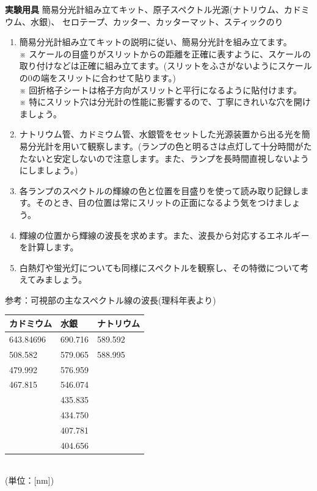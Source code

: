 \newpage

\jikken

\begin{itemsquarebox}[c]{\bf 実験用具}
簡易分光計組み立てキット、原子スペクトル光源(ナトリウム、カドミウム、水銀)、
セロテープ、カッター、カッターマット、スティックのり
\end{itemsquarebox}

\bigskip


\begin{enumerate}

\item 簡易分光計組み立てキットの説明に従い、簡易分光計を組み立てます。\\
※ スケールの目盛りがスリットからの距離を正確に表すように、スケールの取り付けなどは正確に組み立てます。(スリットをふさがないようにスケールの0の端をスリットに合わせて貼ります。)\\
※ 回折格子シートは格子方向がスリットと平行になるように貼付けます。\\
※ 特にスリット穴は分光計の性能に影響するので、丁寧にきれいな穴を開けましょう。

\item ナトリウム管、カドミウム管、水銀管をセットした光源装置から出る光を簡易分光計を用いて観察します。(ランプの色と明るさは点灯して十分時間がたたないと安定しないので注意します。また、ランプを長時間直視しないようにしましょう。)

\item 各ランプのスペクトルの輝線の色と位置を目盛りを使って読み取り記録します。そのとき、目の位置は常にスリットの正面になるよう気をつけましょう。

\item 輝線の位置から輝線の波長を求めます。また、波長から対応するエネルギーを計算します。

\item 白熱灯や蛍光灯についても同様にスペクトルを観察し、その特徴について考えてみましょう。


\end{enumerate}

\newpage

参考：可視部の主なスペクトル線の波長(理科年表より)\\
\hspace*{1cm}
\begin{tabular}{|p{2.0cm}|p{2.0cm}|p{2.0cm}|}
\hline
カドミウム & 水銀 & ナトリウム \\
\hline\hline
643.84696 & 690.716& 589.592 \\
\hline
508.582 & 579.065 & 588.995 \\
\hline
479.992 & 576.959 & \\
\hline
467.815 & 546.074 & \\
\hline
& 435.835 & \\
\hline
& 434.750 & \\
\hline
& 407.781 & \\
\hline
& 404.656 & \\
\hline
\end{tabular}\\
\hspace*{6.0cm}(単位：[nm])

